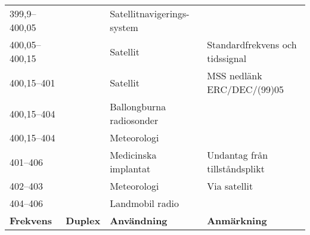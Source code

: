\documentclass[10pt,swedish,a4paper,twoside]{article}
\begin{document}
\begin{landscape}
\begin{longtable}{llll}
	399,9--400,05      &                 & Satellitnavigerings-system  &  \\
	400,05--400,15     &                 & Satellit                    & Standardfrekvens och tidssignal \\
	400,15--401        &                 & Satellit                    & MSS nedlänk ERC/DEC/(99)05      \\
	400,15--404        &                 & Ballongburna radiosonder    &  \\
	400,15--404        &                 & Meteorologi                 &  \\
	401--406           &                 & Medicinska implantat        & Undantag från tillståndsplikt   \\
	402--403           &                 & Meteorologi                 & Via satellit                    \\
	404--406           &                 & Landmobil radio             &  \\
	\textbf{Frekvens}  & \textbf{Duplex} & \textbf{Användning}         & \textbf{Anmärkning}             \\ \hline


\end{longtable}
\end{landscape}
\end{document}
